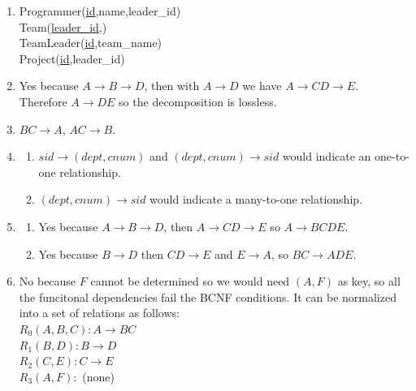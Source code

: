 \documentclass{article}
\begin{document}
\begin{enumerate}
\begin{center}
          \end{center}
    \item Programmer(\underline{id},name,leader\_id)\\Team(\underline{leader\_id},)\\TeamLeader(\underline{id},team\_name)\\Project(\underline{id},leader\_id)
    \item Yes because $A\rightarrow B\rightarrow D$, then with $A\rightarrow D$ we have $A\rightarrow CD\rightarrow E$. Therefore $A\rightarrow DE$ so the decomposition is lossless.
    \item $BC\rightarrow A$, $AC\rightarrow B$.
    \item \begin{enumerate}
              \item $sid\rightarrow (dept,cnum)$ and $(dept,cnum)\rightarrow sid$ would indicate an one-to-one relationship.
              \item $(dept,cnum)\rightarrow sid$ would indicate a many-to-one relationship.
          \end{enumerate}
    \item \begin{enumerate}
              \item Yes because $A\rightarrow B\rightarrow D$, then $A\rightarrow CD\rightarrow E$ so $A\rightarrow BCDE$.
              \item Yes because $B\rightarrow D$ then $CD\rightarrow E$ and $E\rightarrow A$, so $BC\rightarrow ADE$.
          \end{enumerate}
    \item No because $F$ cannot be determined so we would need $(A,F)$ as key, so all the funcitonal dependencies fail the BCNF conditions. It can be normalized into a set of relations as follows:\\$R_0(A,B,C): A\rightarrow BC$\\$R_1(B,D):B\rightarrow D$\\$R_2(C,E):C\rightarrow E$\\$R_3(A,F):$ (none)
\end{enumerate}
\end{document}

